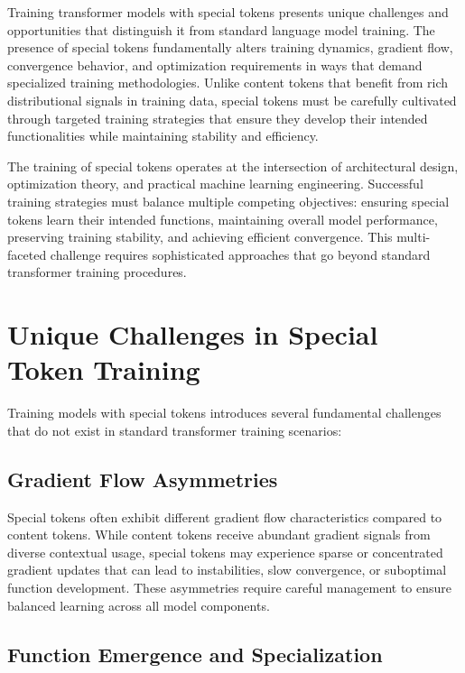 
Training transformer models with special tokens presents unique challenges and opportunities that distinguish it from standard language model training. The presence of special tokens fundamentally alters training dynamics, gradient flow, convergence behavior, and optimization requirements in ways that demand specialized training methodologies. Unlike content tokens that benefit from rich distributional signals in training data, special tokens must be carefully cultivated through targeted training strategies that ensure they develop their intended functionalities while maintaining stability and efficiency.

The training of special tokens operates at the intersection of architectural design, optimization theory, and practical machine learning engineering. Successful training strategies must balance multiple competing objectives: ensuring special tokens learn their intended functions, maintaining overall model performance, preserving training stability, and achieving efficient convergence. This multi-faceted challenge requires sophisticated approaches that go beyond standard transformer training procedures.

\section{Unique Challenges in Special Token Training}

Training models with special tokens introduces several fundamental challenges that do not exist in standard transformer training scenarios:

\subsection{Gradient Flow Asymmetries}

Special tokens often exhibit different gradient flow characteristics compared to content tokens. While content tokens receive abundant gradient signals from diverse contextual usage, special tokens may experience sparse or concentrated gradient updates that can lead to instabilities, slow convergence, or suboptimal function development. These asymmetries require careful management to ensure balanced learning across all model components.

\subsection{Function Emergence and Specialization}

